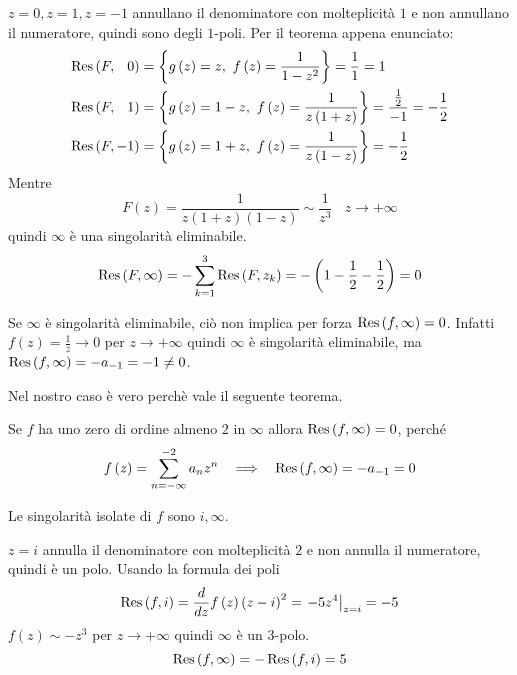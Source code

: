 $z=0,z=1,z=-1$ annullano il denominatore con molteplicità $1$ e non annullano il numeratore, quindi sono degli $1$-poli. Per il teorema appena enunciato:
\begin{align*}
\Res \left( F,\phantom{-}0\right) &=\left\{g\left( z\right) =  z,\ f\left( z\right) =\frac{1}{1-z^{2}}\right\} =\frac{1}{1} =1\\
\Res \left( F,\phantom{-}1\right) &=\left\{g\left( z\right) =1-z,\ f\left( z\right) =\frac{1}{z\left( 1+z\right)}\right\} =\frac{\frac{1}{2}}{-1} =-\frac{1}{2}\\
\Res \left( F,-1\right) 			 &=\left\{g\left( z\right) =1+z,\ f\left( z\right) =\frac{1}{z\left( 1-z\right)}\right\} =-\frac{1}{2}
\end{align*}
Mentre
\begin{equation*}
F\left( z\right) =\frac{1}{z\left( 1+z\right)\left( 1-z\right)} \sim \frac{1}{z^{3}} \ \ \ \ z\rightarrow +\infty 
\end{equation*}
quindi $\infty $ è una singolarità eliminabile.
\begin{equation*}
\operatorname{Res} \left( F,\infty \right) =-\sum\limits ^{3}_{k=1}\operatorname{Res} \left( F,z_{k}\right) =-\left( 1-\frac{1}{2} -\frac{1}{2}\right) =0
\end{equation*}
\begin{rem}
Se $\infty $ è singolarità eliminabile, ciò non implica per forza $\operatorname{Res} \left( f,\infty \right) =0$. Infatti $f\left( z\right) =\frac{1}{z}\rightarrow 0$ per $z\rightarrow +\infty $ quindi $\infty $ è singolarità eliminabile, ma $\operatorname{Res} \left( f,\infty \right) =-a_{-1} =-1\neq 0$.
\end{rem}
\begin{rem}
Nel nostro caso è vero perchè vale il seguente teorema.
\end{rem}
\begin{thm}
Se $f$ ha uno zero di ordine almeno $2$ in $\infty $ allora $\operatorname{Res} \left( f,\infty \right) =0$, perché
\begin{equation*}
f\left( z\right) =\sum\limits ^{-2}_{n=-\infty } a_{n} z^{n} \ \ \implies \ \ \operatorname{Res} \left( f,\infty \right) =-a_{-1} =0
\end{equation*}
\end{thm}
\Soluzione

Le singolarità isolate di $f$ sono $i,\infty $.

$z=i$ annulla il denominatore con molteplicità $2$ e non annulla il numeratore, quindi è un polo. Usando la formula dei poli
\begin{equation*}
\operatorname{Res} \left( f,i\right) =\frac{d}{dz} f\left( z\right)\left( z-i\right)^{2} =\left. -5z^{4}\right| _{z=i} =-5
\end{equation*}
$f\left( z\right) \sim -z^{3}$ per $z\rightarrow +\infty $ quindi $\infty $ è un $3$-polo.
\begin{equation*}
\operatorname{Res} \left( f,\infty \right) =-\operatorname{Res} \left( f,i\right) =5
\end{equation*}
\Soluzione

